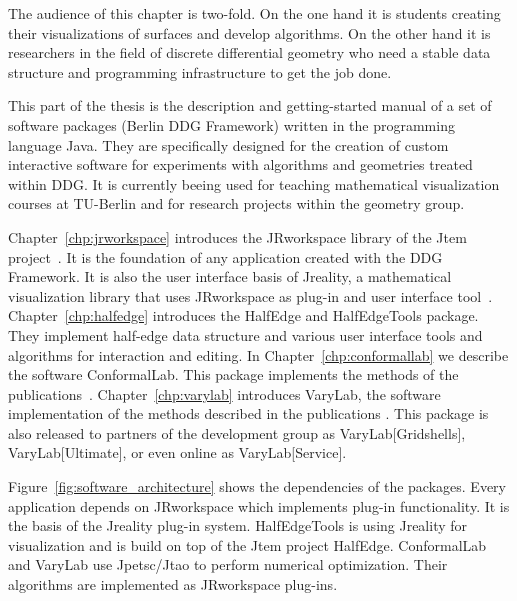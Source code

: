\documentclass[Thesis.tex]{subfiles}
\begin{document}
The audience of this chapter is two-fold. On the one hand it is students creating their 
visualizations of surfaces and develop algorithms. On the other hand it is researchers in the
field of discrete differential geometry who need a stable data structure and programming
infrastructure to get the job done.

This part of the thesis is the description and getting-started manual of a set of software packages
(Berlin DDG Framework) written in the programming language {\sc Java}. They are 
specifically designed for the creation of custom interactive software for experiments with algorithms and geometries treated within DDG. It is currently beeing used for teaching mathematical visualization courses at TU-Berlin \cite{VisMathHomepage} and for research projects within the geometry group.

Chapter~\ref{chp:jrworkspace} introduces the {\sc JRworkspace} library of the 
{\sc Jtem} project~\cite{JtemWebsite}. It is the foundation of any application created with 
the DDG Framework. It is also the user interface basis of {\sc Jreality}, a mathematical 
visualization library that uses {\sc JRworkspace} as plug-in and user interface 
tool~\cite{JrealityWebsite}. Chapter~\ref{chp:halfedge} introduces the 
{\sc HalfEdge} and {\sc HalfEdgeTools} package. They implement half-edge data 
structure and various user interface tools and algorithms for interaction and editing.  
In Chapter~\ref{chp:conformallab} we describe the software 
{\sc ConformalLab}. This package implements the methods of the 
publications~\cite{Bobenko2010, OWR2012, Sechelmann2012, BobSechSpr}.
Chapter~\ref{chp:varylab} introduces {\sc VaryLab}, the software implementation of the 
methods described in the publications \cite{Lafuente2011, Lafuente2012, Sechelmann2012}.
This package is also released to partners of the development group as {\sc VaryLab[Gridshells]},
{\sc VaryLab[Ultimate]}, or even online as {\sc VaryLab[Service]}\cite{varylab-web-page}.

Figure~\ref{fig:software_architecture} shows the dependencies of the packages. Every
application depends on {\sc JRworkspace} which implements plug-in functionality. It is
the basis of the {\sc Jreality} plug-in system. {\sc Half\-Edge\-Tools} is using {\sc Jreality} 
for visualization and is build on top of the {\sc Jtem} project {\sc Half\-Edge}. 
{\sc ConformalLab} and {\sc VaryLab} use {\sc Jpetsc/Jtao} to perform numerical
optimization. Their algorithms are implemented as {\sc JRworkspace} plug-ins.
\end{document}
